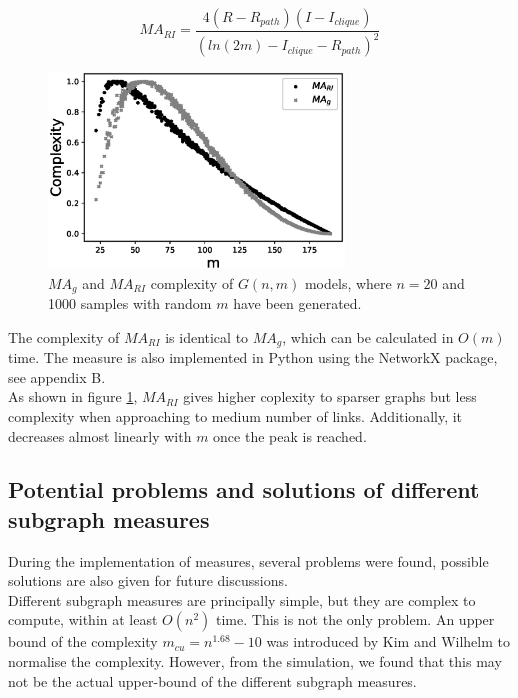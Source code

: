 \documentclass[12pt]{article}
\begin{document}
\begin{equation}
    MA_{RI} = \frac{4(R-R_{path})(I-I_{clique})}{(ln(2m)-I_{clique}-R_{path})^2}
\end{equation}
\begin{figure}[h]
    \centering
    \includegraphics[width=0.7\textwidth]{mariandmag.eps}
    \caption{$MA_g$ and $MA_{RI}$ complexity of $G(n,m)$ models, where $n=20$ and 1000 samples with random $m$ have been generated.}
    \label{fig:marimagcompare}
\end{figure}
\noindent
The complexity of $MA_{RI}$ is identical to $MA_g$, which can be calculated in $O(m)$ time. The measure is also implemented in Python using the NetworkX package, see appendix B.\\

As shown in figure \ref{fig:marimagcompare}, $MA_{RI}$ gives higher coplexity to sparser graphs but less complexity when approaching to medium number of links. Additionally, it decreases almost linearly with $m$ once the peak is reached.

\subsection{Potential problems and solutions of different subgraph measures}
\label{problem}
During the implementation of measures, several problems were found, possible solutions are also given for future discussions.\\
Different subgraph measures are principally simple, but they are complex to compute, within at least $O(n^2)$ time\cite{KIM20082637}. This is not the only problem. An upper bound of the complexity $m_{cu} = n^{1.68}-10$ was introduced by Kim and Wilhelm\cite{KIM20082637} to normalise the complexity. However, from the simulation, we found that this may not be the actual upper-bound of the different subgraph measures.
\end{document}
